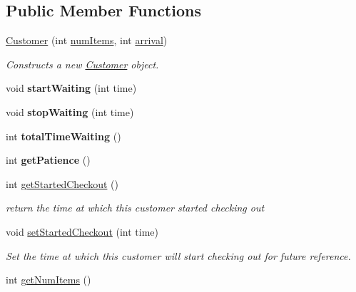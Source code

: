 \subsection*{Public Member Functions}
\begin{CompactItemize}
\item 
\hyperlink{class_customer_69f5e0864420308a7842c74b84f8635a}{Customer} (int \hyperlink{class_customer_d7463824c52b73b3a4f772f4ba3c902a}{numItems}, int \hyperlink{class_person_bcad6c190949170c19df773b5b2757ac}{arrival})
\begin{CompactList}\small\item\em Constructs a new \hyperlink{class_customer}{Customer} object. \item\end{CompactList}\item 
\hypertarget{class_customer_688d6d47e6cc84f41f8165624d9fd936}{
void \textbf{startWaiting} (int time)}
\label{class_customer_688d6d47e6cc84f41f8165624d9fd936}

\item 
\hypertarget{class_customer_f4f2c228a852f22cb7a8dccd45db971c}{
void \textbf{stopWaiting} (int time)}
\label{class_customer_f4f2c228a852f22cb7a8dccd45db971c}

\item 
\hypertarget{class_customer_5de8e7c1faf127325b12ea593a192bf2}{
int \textbf{totalTimeWaiting} ()}
\label{class_customer_5de8e7c1faf127325b12ea593a192bf2}

\item 
\hypertarget{class_customer_4c5d8774517801f4b369505d9a0cc7da}{
int \textbf{getPatience} ()}
\label{class_customer_4c5d8774517801f4b369505d9a0cc7da}

\item 
\hypertarget{class_customer_20c3458cd265fcacfad63339172264ed}{
int \hyperlink{class_customer_20c3458cd265fcacfad63339172264ed}{getStartedCheckout} ()}
\label{class_customer_20c3458cd265fcacfad63339172264ed}

\begin{CompactList}\small\item\em return the time at which this customer started checking out \item\end{CompactList}\item 
void \hyperlink{class_customer_70b41b48c5b37fc41bb1fce713edc743}{setStartedCheckout} (int time)
\begin{CompactList}\small\item\em Set the time at which this customer will start checking out for future reference. \item\end{CompactList}\item 
\hypertarget{class_customer_56588b611df6ad6aaf42bda14fe550bc}{
int \hyperlink{class_customer_56588b611df6ad6aaf42bda14fe550bc}{getNumItems} ()}
\label{class_customer_56588b611df6ad6aaf42bda14fe550bc}


\end{CompactItemize}

